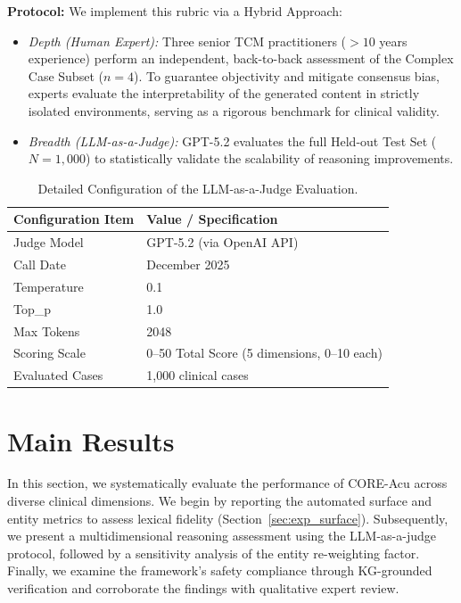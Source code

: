 \documentclass[preprint,5p,times,twocolumn,fleqn]{elsarticle}
\begin{document}
\begin{enumerate}
    \noindent\textbf{Protocol:} We implement this rubric via a Hybrid Approach:
    \begin{itemize}
        \item \textit{Depth (Human Expert):} Three senior TCM practitioners ($>10$ years experience) perform an independent, back-to-back assessment of the Complex Case Subset ($n=4$). To guarantee objectivity and mitigate consensus bias, experts evaluate the interpretability of the generated content in strictly isolated environments, serving as a rigorous benchmark for clinical validity.
        \item \textit{Breadth (LLM-as-a-Judge):} GPT-5.2 evaluates the full Held-out Test Set ($N=1,000$) to statistically validate the scalability of reasoning improvements.
    \end{itemize}
\end{enumerate}


\begin{table}[htbp]
    \centering
    \caption{Detailed Configuration of the LLM-as-a-Judge Evaluation.}
    \label{tab:judge_details}
    

    \renewcommand{\arraystretch}{1.2}
    \small 
    
    \begin{tabularx}{\columnwidth}{l X}
        \toprule
        \textbf{Configuration Item} & \textbf{Value / Specification} \\
        \midrule
        Judge Model & GPT-5.2 (via OpenAI API) \\
        Call Date & December 2025 \\
        Temperature & 0.1 \\
        Top\_p & 1.0 \\
        Max Tokens & 2048 \\
        
        Scoring Scale & 0--50 Total Score \newline (5 dimensions, 0--10 each) \\
        
        Evaluated Cases & 1{,}000 clinical cases \\
        \bottomrule
    \end{tabularx}
\end{table}

\section{Main Results}
In this section, we systematically evaluate the performance of CORE-Acu across diverse clinical dimensions. We begin by reporting the automated surface and entity metrics to assess lexical fidelity (Section~\ref{sec:exp_surface}). Subsequently, we present a multidimensional reasoning assessment using the LLM-as-a-judge protocol, followed by a sensitivity analysis of the entity re-weighting factor. Finally, we examine the framework's safety compliance through KG-grounded verification and corroborate the findings with qualitative expert review.
\end{document}
